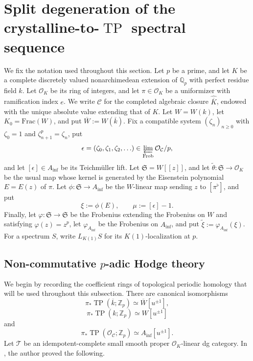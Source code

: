 \documentclass[11pt]{amsart}
\numberwithin{equation}{section}
\newcommand{\Q}{\mathbb{Q}}
\newcommand{\Z}{\mathbb{Z}}
\newcommand{\sC}{\mathcal{C}}
\newcommand{\sO}{\mathcal{O}}
\newcommand{\sT}{\mathcal{T}}
\newcommand{\mf}{\mathfrak}
\newcommand{\mS}{\mf{S}}
\numberwithin{equation}{section}
\renewcommand{\lim}{\operatornamewithlimits{\varprojlim}}
\newcommand{\ol}{\overline}
\newcommand{\Ainf}{A_{\operatorname{inf}}}
\newcommand{\TP}{\operatorname{TP}}
\newcommand{\LK}{{L_{K(1)}}}
\begin{document}
\section{\texorpdfstring{Split degeneration of the crystalline-to-$\TP$ spectral sequence}{Split degeneration of the crystalline-to-TP spectral sequence}}
We fix the notation used throughout this section.  Let $p$ be a prime, and
let $K$ be a complete discretely valued nonarchimedean extension of $\Q_p$
with perfect residue field $k$.  Let $\sO_K$ be its ring of integers, and
let $\pi\in\sO_K$ be a uniformizer with ramification index $e$.  We write
$\sC$ for the completed algebraic closure $\widehat{\overline K}$, endowed
with the unique absolute value extending that of $K$.  Let $W=W(k)$, let
$K_0=\mathrm{Frac}(W)$, and put $\ol W:=W(\ol k)$. Fix a compatible system $(\zeta_n)_{n\geq 0}$ with $\zeta_0=1$ and
$\zeta_{n+1}^p=\zeta_n$, put
\[
  \epsilon=(\zeta_0,\zeta_1,\zeta_2,\ldots)
  \in \lim_{\mathrm{Frob}}\sO_\sC/p,
\]
and let $[\epsilon]\in\Ainf$ be its Teichm\"uller lift.  Let
$\mS=W[[z]]$, and let $\tilde\theta:\mS\to\sO_K$ be the usual map whose
kernel is generated by the Eisenstein polynomial $E=E(z)$ of $\pi$.  Let
$\phi:\mS\to\Ainf$ be the $W$-linear map sending $z$ to $[\pi^\flat]$, and
put
\[
  \xi:=\phi(E),
  \qquad
  \mu:=[\epsilon]-1.
\]
Finally, let $\varphi:\mS\to\mS$ be the Frobenius extending the Frobenius on
$W$ and satisfying $\varphi(z)=z^p$, let $\varphi_{\Ainf}$ be the Frobenius
on $\Ainf$, and put $\tilde\xi:=\varphi_{\Ainf}(\xi)$. For a spectrum $S$, write $\LK S$ for its $K(1)$-localization at $p$. 

\subsection{\texorpdfstring{Non-commutative $p$-adic Hodge theory}{Non-commutative p-adic Hodge theory}}
We begin by recording the coefficient rings of topological periodic homology that will be used throughout this subsection. There are canonical isomorphisms
\[
\pi_*\TP(\ol{k};\Z_p)\simeq \ol{W}[u^{\pm 1}],
\]
\[
\pi_*\TP(k;\Z_p)\simeq W[u^{\pm 1}]
\]
and
\[
\pi_*\TP(\sO_{\sC};\Z_p)\simeq \Ainf[u^{\pm 1}].
\]
Let $\sT$ be an idempotent-complete small smooth proper $\sO_K$-linear dg category. In \cite{M26}, the author proved the following.
\end{document}
